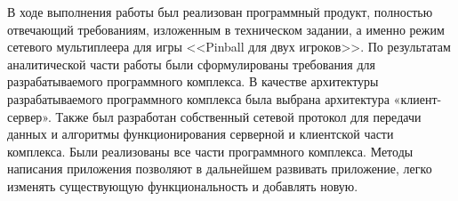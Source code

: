\Conclusion

В ходе выполнения работы был реализован программный продукт, полностью отвечающий требованиям, изложенным в техническом задании, а именно режим сетевого мультиплеера для игры <<Pinball для двух игроков>>. 
По результатам аналитической части работы были сформулированы требования для разрабатываемого программного комплекса.
В качестве архитектуры разрабатываемого программного комплекса была выбрана архитектура «клиент-сервер». Также был разработан собственный сетевой протокол для передачи данных и алгоритмы функционирования серверной и клиентской части комплекса. Были реализованы все части программного комплекса. Методы написания приложения позволяют в дальнейшем развивать приложение, легко изменять существующую функциональность и добавлять новую.
